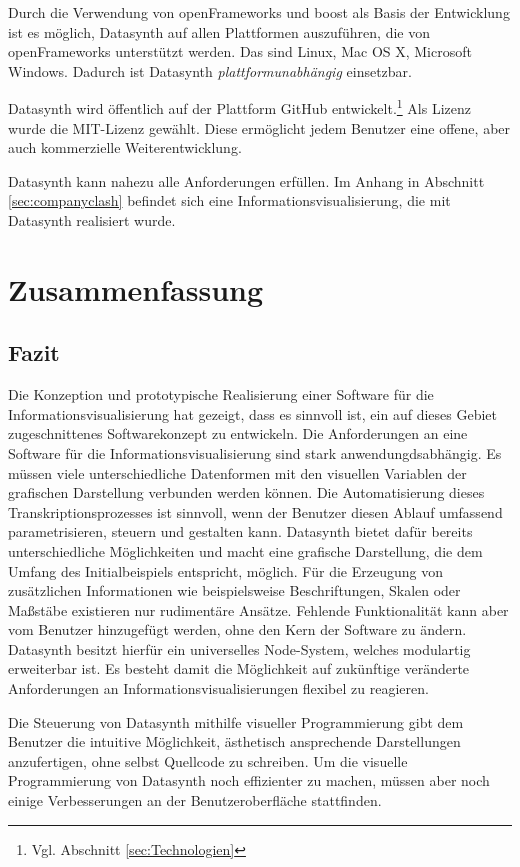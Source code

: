 \documentclass[a4paper, 
               12pt,
               DIV=calc,
               version=first,
               pdftex,
               headsepline,
               footsepline,
               bibtotocnumbered,
               liststotocnumbered]{scrreprt}
\begin{document}
Durch die Verwendung von openFrameworks und boost als Basis der Entwicklung
ist es möglich, Datasynth auf allen Plattformen auszuführen, die von openFrameworks
unterstützt werden. Das sind Linux, Mac OS X, Microsoft Windows.
Dadurch ist Datasynth \textit{plattformunabhängig} einsetzbar.

Datasynth wird öffentlich auf der Plattform GitHub entwickelt.\footnote{Vgl.
Abschnitt \ref{sec:Technologien}} Als Lizenz wurde die MIT-Lizenz gewählt.
Diese ermöglicht jedem Benutzer eine offene, aber auch kommerzielle Weiterentwicklung.

Datasynth kann nahezu alle Anforderungen erfüllen. Im Anhang in Abschnitt
\ref{sec:companyclash} befindet sich eine Informationsvisualisierung, die mit
Datasynth realisiert wurde.

\chapter{Zusammenfassung}
\label{cha:Zusammenfassung}
\section{Fazit}
\label{sec:Fazit}
Die Konzeption und prototypische Realisierung einer Software für die
Informationsvisualisierung hat gezeigt, dass es sinnvoll ist,
ein auf dieses Gebiet zugeschnittenes Softwarekonzept zu entwickeln.
Die Anforderungen an eine Software für die Informationsvisualisierung sind stark
anwendungdsabhängig. Es müssen viele unterschiedliche Datenformen
mit den visuellen Variablen der grafischen Darstellung verbunden werden können.
Die Automatisierung dieses Transkriptionsprozesses ist sinnvoll,
wenn der Benutzer diesen Ablauf umfassend parametrisieren, steuern und gestalten kann.
Datasynth bietet dafür bereits unterschiedliche Möglichkeiten und
macht eine grafische Darstellung, die dem Umfang des Initialbeispiels
entspricht, möglich. Für die Erzeugung von zusätzlichen Informationen
wie beispielsweise Beschriftungen, Skalen oder
Maßstäbe existieren nur rudimentäre Ansätze.
Fehlende Funktionalität kann aber vom Benutzer hinzugefügt werden, ohne
den Kern der Software zu ändern. Datasynth besitzt hierfür ein universelles
Node-System, welches modulartig erweiterbar ist. Es besteht
damit die Möglichkeit auf zukünftige veränderte Anforderungen an
Informationsvisualisierungen flexibel zu reagieren.

Die Steuerung von Datasynth mithilfe visueller Programmierung gibt dem Benutzer
die intuitive Möglichkeit, ästhetisch ansprechende Darstellungen
anzufertigen, ohne selbst Quellcode zu schreiben. Um die visuelle
Programmierung von Datasynth noch effizienter zu machen, müssen aber
noch einige Verbesserungen an der Benutzeroberfläche stattfinden.
\end{document}
